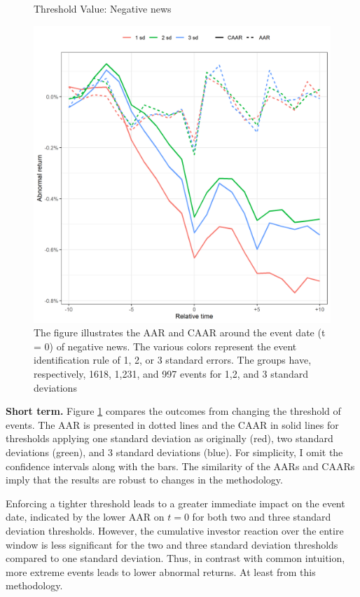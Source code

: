 \begin{figure} [H]
    \centering
    \caption{Threshold Value: Negative news}
    \includegraphics[scale=0.6]{Projekt/1.Figures analysis/ST_negative_sensitivity.png}
     \caption*{\footnotesize The figure illustrates the AAR and CAAR around the event date (t = 0) of negative news. The various colors represent the event identification rule of 1, 2, or 3 standard errors. The groups have, respectively, 1618, 1,231, and 997 events for 1,2, and 3 standard deviations}
    \label{fig:ST_neg_sensitivity}
\end{figure} 

\textbf{Short term.} Figure \ref{fig:ST_neg_sensitivity} compares the outcomes from changing the threshold of events. The AAR is presented in dotted lines and the CAAR in solid lines for thresholds applying one standard deviation as originally (red), two standard deviations (green), and 3 standard deviations (blue). For simplicity, I omit the confidence intervals along with the bars. The similarity of the AARs and CAARs imply that the results are robust to changes in the methodology. 

Enforcing a tighter threshold leads to a greater immediate impact on the event date, indicated by the lower AAR on $t=0$ for both two and three standard deviation thresholds. However, the cumulative investor reaction over the entire window is less significant for the two and three standard deviation thresholds compared to one standard deviation. Thus, in contrast with common intuition, more extreme events leads to lower abnormal returns. At least from this methodology. 

